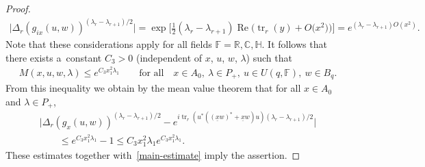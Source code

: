 \documentclass[pdftex]{sigma}
\numberwithin{equation}{section}
\DeclareMathOperator{\Ree}{Re}
\begin{document}
\begin{proof}
\begin{gather*}
\big|\Delta_r(g_{ix}(u,w))^{(\lambda_r-\lambda_{r+1})/2}\big|=\exp\big[\tfrac 12 (\lambda_r-\lambda_{r+1})
 \Ree\big(\operatorname{tr}_r(y)+ O\big(x^2\big)\big)\big]=e^{(\lambda_r -\lambda_{r+1}) O(x^2)}.
\end{gather*}
Note that these considerations apply for all f\/ields $\mathbb F=\mathbb R, \mathbb C, \mathbb H$. It follows that there
exists a~constant $C_3>0$ (independent of $x$, $u$, $w$, $\lambda$) such that
\begin{gather*}
M(x,u,w,\lambda)\le e^{C_3x_1^2\lambda_1}
\qquad
\text{for all}
\quad
x\in A_0, \  \lambda\in P_+,  \ u\in U(q, \mathbb F), \ w \in B_q.
\end{gather*}
From this inequality we obtain by the mean value theorem that for all $x\in A_0$ and $\lambda\in P_+$,
\begin{gather*}
\big|  \Delta_r(g_{x}(u,w))^{(\lambda_r-\lambda_{r+1})/2}- e^{i \operatorname{tr}_r(u^*((\underline x w)^*+ \underline x w)u)
 (\lambda_r-\lambda_{r+1})/2}\big|
\\
\qquad{}
 \leq e^{C_3x_1^2\lambda_1}-1 \leq C_3 x_1^2\lambda_1 e^{C_3x_1^2\lambda_1}.
\end{gather*}
These estimates together with~\eqref{main-estimate} imply the assertion.
\end{proof}
\end{document}
